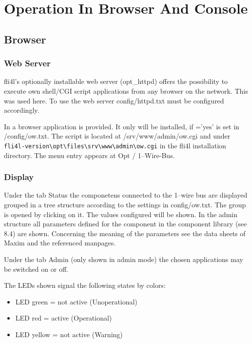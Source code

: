 \section{Operation In Browser And Console}

{
\subsection{Browser}
}
\subsubsection{Web Server}
fli4l's optionally installable web server (opt\_httpd) offers the possibility
to execute own shell/CGI script applications from any browser on the network.
This was used here. To use the web server config/httpd.txt must be configured
accordingly.

In  a browser application is provided. It only will be installed, if
='yes' is set in /config/ow.txt. The script is located at
/srv/www/admin/ow.cgi and under\\ \verb!fli4l-version\opt\files\srv\www\admin\ow.cgi!
in the fli4l installation directory. The menu entry appears at \glqq{}Opt /
1--Wire-Bus\grqq{}.

\subsubsection{Display}
Under the tab \glqq{}Status\grqq{} the componetens connected to the 1--wire bus
are displayed grouped in a tree structure according to the settings in config/ow.txt.
The group is opened by \glq{}clicking\grq{} on it. The values configured will be
shown. In the admin structure all parameters defined for the component in the
component library (see 8.4) are shown. Concerning the meaning of the parameters
see the data sheets of Maxim and the referenced manpages.

Under the tab \glqq{}Admin\grqq{} (only shown in admin mode) the chosen applications
may be switched on or off.

The LEDs shown signal the following states by colors:
\begin{itemize}
\item LED green = not active (Unoperational)
\item LED red = active (Operational)
\item LED yellow = not active (Warning)
\end{itemize}

